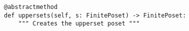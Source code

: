 \begin{verbatim}
@abstractmethod
def uppersets(self, s: FinitePoset) -> FinitePoset:
    """ Creates the upperset poset """
\end{verbatim}